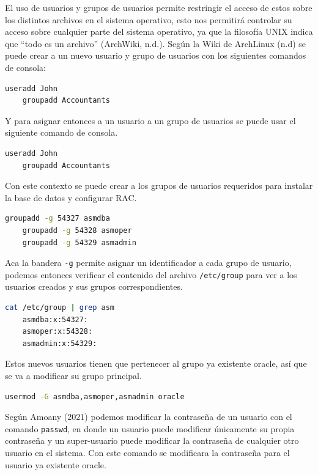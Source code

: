 \documentclass{article}
\begin{document}
El uso de usuarios y grupos de usuarios permite restringir el acceso de estos sobre los distintos archivos en el sistema operativo, esto nos permitirá controlar su acceso sobre cualquier parte del sistema operativo, ya que la filosofía UNIX indica que ``todo es un archivo'' (ArchWiki, n.d.). Según la Wiki de ArchLinux (n.d) se puede crear a un nuevo usuario y grupo de usuarios con los siguientes comandos de consola:

\begin{lstlisting}[style=mystyle,language=bash]
	useradd John
	groupadd Accountants
\end{lstlisting}

Y para asignar entonces a un usuario a un grupo de usuarios se puede usar el siguiente comando de consola.

\begin{lstlisting}[style=mystyle,language=bash]
	useradd John
	groupadd Accountants
\end{lstlisting}

Con este contexto se puede crear a los grupos de usuarios requeridos para instalar la base de datos y configurar RAC.

\begin{lstlisting}[style=mystyle,language=bash]
	groupadd -g 54327 asmdba
	groupadd -g 54328 asmoper
	groupadd -g 54329 asmadmin
\end{lstlisting}

Aca la bandera \texttt{-g} permite asignar un identificador a cada grupo de usuario, podemos entonces verificar el contenido del archivo \texttt{/etc/group} para ver a los usuarios creados y sus grupos correspondientes.

\begin{lstlisting}[style=mystyle,language=bash]
	cat /etc/group | grep asm
	asmdba:x:54327:
	asmoper:x:54328:
	asmadmin:x:54329:
\end{lstlisting}

Estos nuevos usuarios tienen que pertenecer al grupo ya existente oracle, así que se va a modificar su grupo principal.

\begin{lstlisting}[style=mystyle,language=bash]
	usermod -G asmdba,asmoper,asmadmin oracle
\end{lstlisting}

Según Amoany (2021) podemos modificar la contraseña de un usuario con el comando \texttt{passwd}, en donde un usuario puede modificar únicamente su propia contraseña y un super-usuario puede modificar la contraseña de cualquier otro usuario en el sistema. Con este comando se modificara la contraseña para el usuario ya existente oracle.
\end{document}
